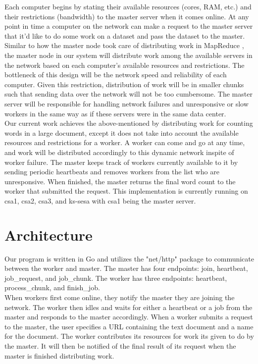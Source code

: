 \documentclass[twoside]{article}
\begin{document}
Each computer begins by stating their available resources (cores, RAM, etc.) and their restrictions (bandwidth) to the master server when it comes online. At any point in time a computer on the network can make a request to the master server that it'd like to do some work on a dataset and pass the dataset to the master. Similar to how the master node took care of distributing work in MapReduce \cite{mapreduce}, the master node in our system will distribute work
among the available servers in the network based
on each computer's available resources and restrictions. The bottleneck of this design will be the network speed and reliability of each computer. Given this restriction, distribution of work will be in smaller chunks such that sending data over the network will not be too cumbersome. The master server will be responsible for handling network failures and unresponsive or slow workers in the same way as if these servers were in the same data center. \\

Our current work achieves the above-mentioned by distributing work for counting words in a large document, except it does not take into account the available resources and restrictions for a worker. A worker can come and go at any time, and work will be distributed accordingly to this dynamic network inspite of worker failure. The master keeps track of workers currently available to it by sending periodic heartbeats and removes workers from the list who are unresponsive. When
finished, the master returns the final word count to the worker that submitted the request. This implementation is currently running on csa1, csa2, csa3, and ks-sesa with csa1 being the master server. 
\section{Architecture}
Our program is written in Go and utilizes the "net/http" package to communicate between the worker and master. The master has four endpoints: join, heartbeat, job\_request, and job\_chunk. The worker has three endpoints: heartbeat, process\_chunk, and finish\_job. \\

When workers first come online, they notify the master they are joining the network. The worker then idles and waits for either a heartbeat or a job from the master and responds to the master accordingly. When a worker submits a request to the master, the user specifies a URL containing the text document and a name for the document. The worker contributes its resources for work its given to do by the master. It will then be notified of the final result of its request when the master is finished
distributing work. \\
\end{document}
